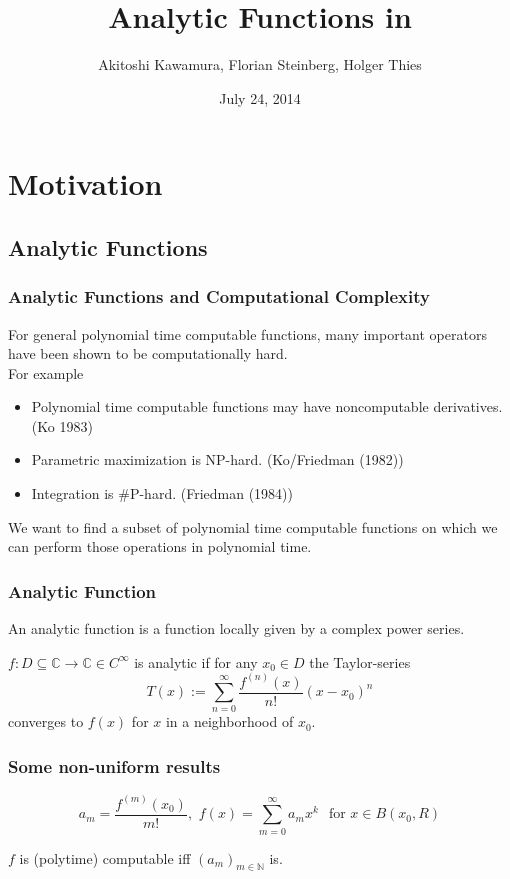 \documentclass[xcolor=pdftex,dvipsnames,table]{beamer}
\title[Analytic Functions in iRRAM]{Analytic Functions in \irram}
\author[A. Kawamura, F. Steinberg, H. Thies]{
		Akitoshi Kawamura, Florian Steinberg, Holger Thies 
}
\institute[CCA 2014]{
Eleventh International Conference on Computability and Complexity in Analysis, Darmstadt
}
\newcommand{\N}{\ensuremath{\mathbb{N}}}
\newcommand{\C}{\ensuremath{\mathbb{C}}}
\begin{document}
\date{July 24, 2014}
\frame{
\titlepage
}
\section{Motivation}
\subsection{Analytic Functions}
\begin{frame}[<+->]
\frametitle{Analytic Functions and Computational Complexity}
\begin{fact}
For general polynomial time computable functions, many important operators have been shown to be computationally hard.\\
For example
\begin{itemize}
\item Polynomial time computable functions may have noncomputable derivatives. (Ko 1983)
\item Parametric maximization is NP-hard. (Ko/Friedman (1982))
\item Integration is \#P-hard. (Friedman (1984))
\end{itemize}
\end{fact}
\pause
We want to find a subset of polynomial time computable functions on which we can perform those operations in polynomial time.
\end{frame}
\begin{frame}
\frametitle{Analytic Function}
An analytic function is a function locally given by a complex power series.\\
\begin{definition}
$f : D \subseteq \C \to \C \in C^\infty$ is analytic if for any $x_0 \in D$ the Taylor-series
$$ T(x) := \sum^\infty_{n=0} \frac{f^{(n)}(x)}{n!}(x-x_0)^n$$
converges to $f(x)$ for $x$ in a neighborhood of $x_0$.  
\end{definition}
\end{frame}
\begin{frame}
\frametitle{Some non-uniform results}

$$a_m =\frac{f^{(m)}(x_0)}{m!} 
, \,\, f(x) = \sum_{m=0}^\infty a_mx^k \,\ \text{ for } x \in B(x_0,R)
$$
\vfill
\begin{theorem}
$f$ is (polytime) computable iff $(a_m)_{m \in \N}$ is.
\end{theorem}
\end{frame}
\end{document}
